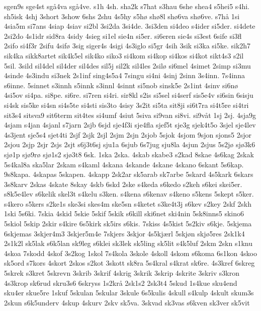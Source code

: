 {sgen9s
sge4st
sg^^e54va
sg^^e54ve.
s1h
4sh.
sha2k
s7hat
s3hau
6she
shea4
s5hei5
s4hi.
sh5isk
4shj
3short
3show
6shs
2shu
4s5hy
s5h^^f8
sh^^f88l
sh^^f86va
sh^^f86ve.
s7h^^e5
1si
4sia5m
si7ans
4siap
4siav
si2bl
3si2da
3si4de.
3si3den
si4deo
s4ider
si5der.
si4dete
2si2do
4s1idr
sid8ra
4sidy
4sieg
si1el
sie4n
si5er.
si6eren
sie4s
si3est
6sife
si3fl
2sifo
si4f3r
2sifu
4sif^^f8
3sig
siger4s
4sigi
4s3iglo
si5gr
4sih
3sik
si3ka
si5ke.
sik2h7
sik4ka
sikk8artet
sik4k5el
sik4ko
siko3
si4kom
si4kop
si4kos
si4kot
sikt4s3
s2il
5sil.
3sild
sil4del
sil4der
sil4des
sil5j
sil2k
sil4les
2sil^^f8
si6mel
4simet
2simp
si3mu
4sinde
4s3indu
si3nek
2s1inf
sing4s5a4
7singu
si4ni
4sinj
2sinn
3s4inn.
7s4inna
s6inne.
5sinnet
s3innh
s5innk
s3innl
4sinnt
si5nob
sinsk5e
2s1int
4sinv
si6n^^f8
4si5ov
si4pa.
si8pe.
si6re.
si7ren
si4ri.
sir8kl
s2is
si5sel
si4serf
sis5e4v
si6sin
6sisju
si4sk
sis5ke
si4sn
si4s5te
si4sti
sis3to
4sisy
3s2it
si5ta
sit8ji
si6t7ra
si4t5re
si4tri
sit3s4
sitsva9
sit6term
sit4tes
si4umf
4siut
5siva
si9van
si8vi.
si9v^^e5t
1sj
2sj.
4sja9g
4sjam
s4jan
4sjanl
s7jarn
2sjb
6sjd
sje4f3i
sje4fla
sjef5t
sje3g
sjek4t5o
3sjel
sje4lev
4s3jent
sje5s4
sjet4ti
2sjf
2sjk
2sjl
2sjm
2sjn
2sjob
5sjok
4sjom
9sjon
sjons5
2sjor
2sjou
2sjp
2sjr
2sjs
2sjt
s6j3t6sj
sju1a
6sjub
6s7jug
sju8la
4sjun
2sjus
5s2j^^f8
sj^^f83k6
sj^^f81p
sj^^f89r^^f8
sj^^f81s2
sj^^f83t8
6sk.
1ska
2ska.
4skab
skabe3
s2kad
8skae
4s6kag
2skak
5s4kal8a
ska5lar
2skam
s4kaml
4skana
4skande
4skane
4skano
6skant
5s6kap.
9s8kapa.
4skapas
5skapen.
4skapp
2sk2ar
sk5arab
sk7arbe
5skard
4s5kark
6skars
3s8karv
2skas
4skate
8skay
4skb
6skd
2ske
s4keda
s6kedo
s2keh
s6kei
skei5er.
s8k5e4lev
s6kelik
skel3t
s4kelu
s3ken.
s4kena
s6kenav
s4keno
s5kens
5skept
s5ker.
s4kero
s5kers
s2ke1s
ske3si
skes4m
ske5sn
s4ketet
s3ke4t3j
s6kev
s2key
2skf
2skh
1ski
5s6ki.
7skia
4skid
5skie
5skif
5skik
s6kill
ski6net
ski4nin
5sk8inns5
skino6
5skiol
5skip
2skir
s4kire
6s5kirk
sk5irs
s6kis.
7skiss
4s5kist
5s2kiv
s6kje.
5skjema
6skjemas
3skjer4m3
3skjer5m4e
7skjers
3skjor
4s5kj^^e6rl
5skj^^f8n
skj^^f85res
2sk1k4
2s1k2l
sk5lak
s6k5lan
sk9leg
s6klei
sk3lek
sk5ling
sk5lit
s4k5luf
2skm
2skn
s1knu
4skoa
7skodd
4skof
3s2kog
1skol
7s4kola
3skole
4skoll
4skom
s6koma
6s1kon
4skoo
sk5ord
s7kors
4skort
2skos
s2kot
3skott
sk8ra
5s4kral
s4krat
sk6re.
4s3kref
6skreg
5skrek
s3kret
5skrevn
3skrib
3skrif
4skrig
3skrik
3skrip
4skrite
3skriv
s3kron
4s3krop
sk6rud
skru3s6
6skryss
1s2kr^^e5
2sk1s2
2sk3t4
5skud
1s4kue
sku4end
sku4er
skue5re
1skuf
5skulan
5skular
3skule
6s5kulis
4skull
s4kulp
4skult
skum3s
2skun
s6k5underv
4skup
4skurv
2skv
sk5va.
3skvad
sk3vas
s6kven
sk3ver
sk5vit
}
